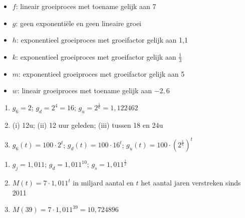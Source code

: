 \begin{Oplossing}{5.1}
      \begin{itemize}
      \item $f$: lineair groeiproces met toename gelijk aan 7
      \item $g$: geen exponentiële en geen lineaire groei
      \item $h$: exponentieel groeiproces met groeifactor gelijk aan 1,1
      \item $k$: exponentieel groeiproces met groeifactor gelijk aan $\frac13$
      \item $m$: exponentieel groeiproces met groeifactor gelijk aan 5
      \item $w$: lineair groeiproces met toename gelijk aan $-2,6$
      \end{itemize}
      
\end{Oplossing}
\begin{Oplossing}{5.2}
     \begin{enumerate}
     \item $g_6=2$; $g_d=2^4=16$; $g_u=2^\frac{1}{6}=1,122462$
     \item (i) 12u; (ii) 12 uur geleden; (iii) tussen 18 en 24u
     \item $g_6(t)=100\cdot 2^t$; $g_d(t)=100\cdot 16^t$; $g_u(t)=100\cdot \left(2^\frac16 \right)^t$
     \end{enumerate}
     
\end{Oplossing}
\begin{Oplossing}{5.3}
      \begin{enumerate}
      \item $g_j=1,011$; $g_d=1,011^{10}$; $g_s=1,011^\frac{1}{2}$
      \item $M(t)=7\cdot 1,011^t$ in miljard aantal en $t$ het aantal jaren verstreken sinds 2011
      \item $M(39)=7\cdot 1,011^{39}=10,724896$
      \end{enumerate}
      
\end{Oplossing}
